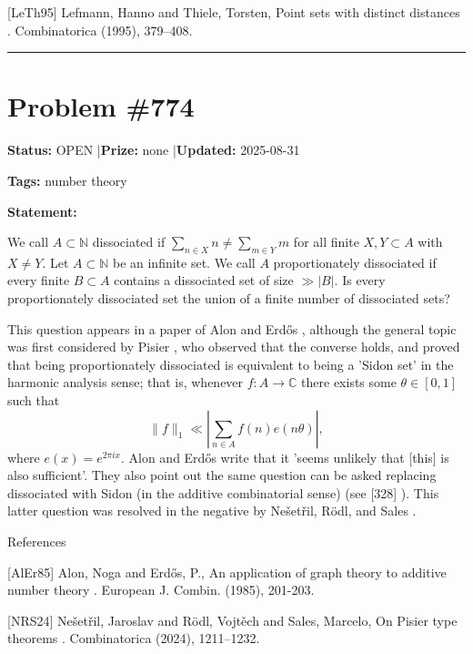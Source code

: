 \documentclass{article}
\begin{document}
[LeTh95] Lefmann, Hanno and Thiele, Torsten, Point sets with distinct distances . Combinatorica (1995), 379--408.

\noindent\rule{\linewidth}{0.4pt}


\section{Problem \#774}
\label{prob:774}

\noindent\textbf{Status:} OPEN \quad|\quad \textbf{Prize:} none \quad|\quad \textbf{Updated:} 2025-08-31

\noindent\textbf{Tags:} number theory

\medskip

\noindent\textbf{Statement:}

We call $A\subset \mathbb{N}$ dissociated if $\sum_{n\in X}n\neq \sum_{m\in Y}m$ for all finite $X,Y\subset A$ with $X\neq Y$. Let $A\subset \mathbb{N}$ be an infinite set. We call $A$ proportionately dissociated if every finite $B\subset A$ contains a dissociated set of size $\gg \lvert B\rvert$. Is every proportionately dissociated set the union of a finite number of dissociated sets?




This question appears in a paper of Alon and Erd\H{o}s \cite{AlEr85}, although the general topic was first considered by Pisier \cite{Pi83}, who observed that the converse holds, and proved that being proportionately dissociated is equivalent to being a 'Sidon set' in the harmonic analysis sense; that is, whenever $f:A\to \mathbb{C}$ there exists some $\theta\in [0,1]$ such that\[\| f\|_1 \ll \left\lvert\sum_{n\in A} f(n)e(n\theta)\right\rvert,\]where $e(x)=e^{2\pi ix}$. Alon and Erd\H{o}s write that it 'seems unlikely that [this] is also sufficient'. They also point out the same question can be asked replacing dissociated with Sidon (in the additive combinatorial sense) (see [328] ). This latter question was resolved in the negative by Ne\v{s}et\v{r}il, R\"{o}dl, and Sales \cite{NRS24}.




References

[AlEr85] Alon, Noga and Erd\H{o}s, P., An application of graph theory to additive number theory . European J. Combin. (1985), 201-203.

[NRS24] Ne\v set\v ril, Jaroslav and R\"odl, Vojt\v ech and Sales, Marcelo, On {P}isier type theorems . Combinatorica (2024), 1211--1232.
\end{document}
